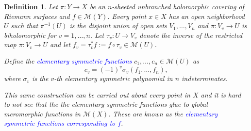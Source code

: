 \documentclass[12pt]{article}
\theoremstyle{thmstyle}
\theoremstyle{defstyle}
\newtheorem{definition}[theorem]{Definition}
\newcommand{\define}[1]{\textcolor{blue}{\textit{#1}}}
\newcommand{\scrM}{\mathscr{M}}
\begin{document}
\begin{definition}
    Let $\pi: Y\to X$ be an $n$-sheeted \emph{unbranched} holomorphic covering of Riemann surfaces and $f\in\scrM(Y)$. Every point $x\in X$ has an open neighborhood $U$ such that $\pi^{-1}(U)$ is the disjoint union of open sets $V_1,\dots, V_n$ and $\pi: V_v\to U$ is biholomorphic for $v = 1,\dots, n$. Let $\tau_v: U\to V_v$ denote the inverse of the restricted map $\pi: V_v\to U$ and let $f_v = \tau_v^\ast f := f\circ\tau_v\in\scrM(U)$.

    Define the \define{elementary symmetric functions} $c_1,\dots, c_n\in\scrM(U)$ as 
    \begin{equation*}
        c_v = (-1)^v\sigma_v\left(f_1,\dots, f_n\right),
    \end{equation*}
    where $\sigma_v$ is the $v$-th elementary symmetric polynomial in $n$ indeterminates. 

    This same construction can be carried out about every point in $X$ and it is hard to not see that the the elementary symmetric functions glue to global meromorphic functions in $\scrM(X)$. These are known as the \define{elementary symmetric functions corresponding to $f$}.
\end{definition}
\end{document}
